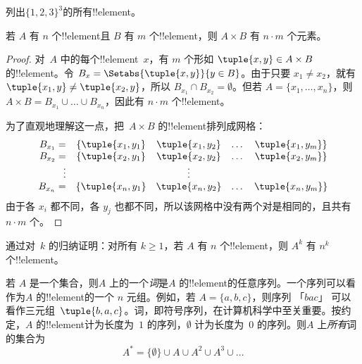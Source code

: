 \documentclass[../../../include/open-logic-section]{subfiles}
\begin{document}
\begin{prob}
列出$\{1, 2, 3\}^3$的所有!!{element}。
\end{prob}

\begin{prop}
若 $A$ 有 $n$ 个!!{element}且 $B$ 有 $m$ 个!!{element}，则 $A
\times B$ 有 $n\cdot m$ 个元素。
\end{prop}

\begin{proof}
对~$A$ 中的每个!!{element}~$x$，有 $m$ 个形如 $\tuple{x, y} \in A \times B$ 的!!{element}。令 $B_x = \Setabs{\tuple{x, y}}{y
  \in B}$。由于只要 $x_1 \neq x_2$，就有 $\tuple{x_1, y} \neq
\tuple{x_2, y}$，所以 $B_{x_1} \cap B_{x_2} = \emptyset$。但若 $A = \{x_1,
\dots, x_n\}$，则 $A \times B = B_{x_1} \cup \dots \cup B_{x_n}$，因此有
$n\cdot m$ 个!!{element}。

为了直观地理解这一点，把~$A \times B$ 的!!{element}排列成网格：
\[
\begin{array}{rcccc}
  B_{x_1} = & \{\tuple{x_1, y_1} & \tuple{x_1, y_2} & \dots & \tuple{x_1, y_m}\}\\
  B_{x_2} = & \{\tuple{x_2, y_1} & \tuple{x_2, y_2} & \dots & \tuple{x_2, y_m}\}\\
  \vdots & & \vdots\\
  B_{x_n} = & \{\tuple{x_n, y_1} & \tuple{x_n, y_2} & \dots & \tuple{x_n, y_m}\}
\end{array}
\]
由于各 $x_i$ 都不同，各 $y_j$ 也都不同，所以该网格中没有两个对是相同的，且共有 $n\cdot m$
个。
\end{proof}

\begin{prob}
通过对~$k$ 的归纳证明：对所有 $k \ge 1$，若 $A$ 有 $n$
个!!{element}，则 $A^k$ 有 $n^k$ 个!!{element}。
\end{prob}

\begin{ex}
若 $A$ 是一个集合，则$A$ 上的一个\emph{词}是$A$ 的!!{element}的任意序列。一个序列可以看作为$A$ 的!!{element}的一个 $n$ 元组。例如，若 $A = \{a, b, c\}$，则序列 「$bac$」 可以看作三元组~$\tuple{b, a, c}$。词，即符号序列，在计算机科学中至关重要。按约定，$A$ 的!!{element}计为长度为~$1$ 的序列，$\emptyset$ 计为长度为~$0$ 的序列。则$A$ 上\emph{所有}词的集合为
\[
A^* = \{\emptyset\} \cup A \cup A^2 \cup A^3 \cup \dots
\]
\end{ex}
\end{document}
